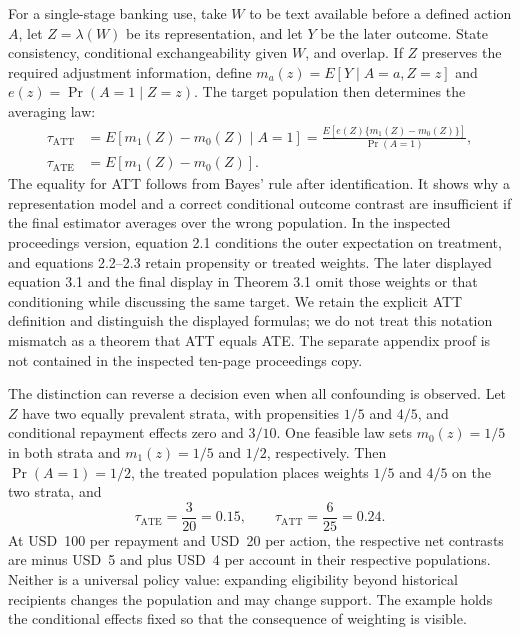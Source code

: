 For a single-stage banking use, take $W$ to be text available before a defined
action $A$, let $Z=\lambda(W)$ be its representation, and let $Y$ be the later
outcome. State consistency, conditional exchangeability given $W$, and overlap.
If $Z$ preserves the required adjustment information, define
$m_a(z)=E[Y\mid A=a,Z=z]$ and $e(z)=\Pr(A=1\mid Z=z)$. The target population
then determines the averaging law:
\begin{align}
 \tau_{\mathrm{ATT}}
 &=E[m_1(Z)-m_0(Z)\mid A=1]
   =\frac{E[e(Z)\{m_1(Z)-m_0(Z)\}]}{\Pr(A=1)},\\
 \tau_{\mathrm{ATE}}
 &=E[m_1(Z)-m_0(Z)].
 \label{eq:rel66-target-weights}
\end{align}
The equality for ATT follows from Bayes' rule after identification. It shows
why a representation model and a correct conditional outcome contrast are
insufficient if the final estimator averages over the wrong population.
In the inspected proceedings version, equation 2.1 conditions the outer
expectation on treatment, and equations 2.2--2.3 retain propensity or treated
weights. The later displayed equation 3.1 and the final display in Theorem 3.1
omit those weights or that conditioning while discussing the same target.
We retain the explicit ATT definition and distinguish the displayed formulas;
we do not treat this notation mismatch as a theorem that ATT equals ATE.
The separate appendix proof is not contained in the inspected ten-page
proceedings copy. \citep{rel66veitch}

The distinction can reverse a decision even when all confounding is observed.
Let $Z$ have two equally prevalent strata, with propensities $1/5$ and $4/5$,
and conditional repayment effects zero and $3/10$. One feasible law sets
$m_0(z)=1/5$ in both strata and $m_1(z)=1/5$ and $1/2$, respectively.
Then $\Pr(A=1)=1/2$, the treated population places weights $1/5$ and $4/5$
on the two strata, and
\begin{equation}
 \tau_{\mathrm{ATE}}=\frac{3}{20}=0.15,\qquad
 \tau_{\mathrm{ATT}}=\frac{6}{25}=0.24.
\end{equation}
At USD~100 per repayment and USD~20 per action, the respective net contrasts
are minus USD~5 and plus USD~4 per account in their respective populations.
Neither is a universal policy value: expanding eligibility beyond historical
recipients changes the population and may change support. The example holds
the conditional effects fixed so that the consequence of weighting is visible.

